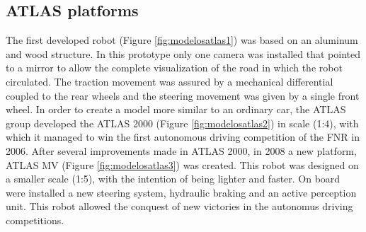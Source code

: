 \subsection{ATLAS platforms}\label{sec:ATLASplatform}	
The first developed robot (Figure \ref{fig:modelosatlas1}) was based on an aluminum and wood structure. In this prototype only one camera was installed that pointed to a mirror to allow the complete visualization of the road in which the robot circulated. The traction movement was assured by a mechanical differential coupled to the rear wheels and the steering movement was given by a single front wheel. In order to create a model more similar to an ordinary car, the ATLAS group developed the ATLAS 2000 (Figure \ref{fig:modelosatlas2}) in scale (1:4), with which it managed to win the first autonomous driving competition of the FNR in 2006. After several improvements made in ATLAS 2000, in 2008 a new platform, ATLAS MV (Figure \ref{fig:modelosatlas3}) was created. This robot was designed on a smaller scale (1:5), with the intention of being lighter and faster. On board were installed a new steering system, hydraulic braking and an active perception unit. This robot allowed the conquest of new victories in the autonomus driving competitions.
